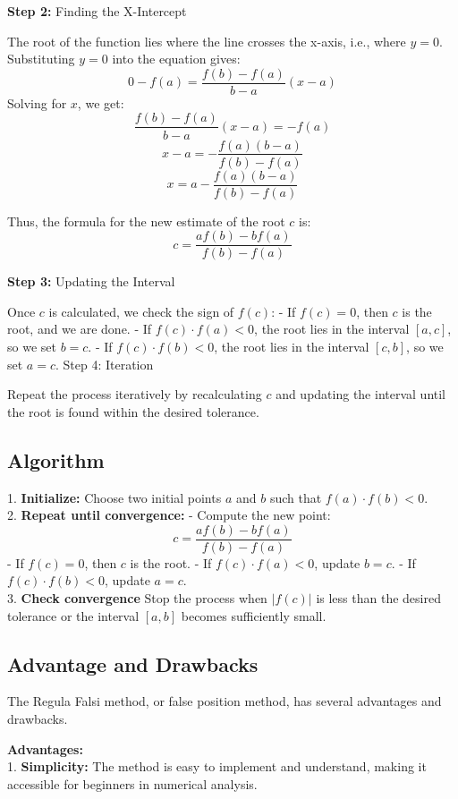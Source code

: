 \documentclass[12pt,a4paper]{article}
\begin{document}
	\textbf{Step 2:} Finding the X-Intercept
	
	The root of the function lies where the line crosses the x-axis, i.e., where \( y = 0 \). Substituting \( y = 0 \) into the equation gives:
	\[
	0 - f(a) = \frac{f(b) - f(a)}{b - a} (x - a)
	\]
	Solving for \( x \), we get:
	\[
	\frac{f(b) - f(a)}{b - a} (x - a) = -f(a)
	\]
	\[
	x - a = -\frac{f(a)(b - a)}{f(b) - f(a)}
	\]
	\[
	x = a - \frac{f(a)(b - a)}{f(b) - f(a)}
	\]
	
	Thus, the formula for the new estimate of the root \( c \) is:
	\[
	c = \frac{a f(b) - b f(a)}{f(b) - f(a)}
	\]
	
	\textbf{Step 3:} Updating the Interval
	
	Once \( c \) is calculated, we check the sign of \( f(c) \):
	- If \( f(c) = 0 \), then \( c \) is the root, and we are done.
	- If \( f(c) \cdot f(a) < 0 \), the root lies in the interval \([a, c]\), so we set \( b = c \).
	- If \( f(c) \cdot f(b) < 0 \), the root lies in the interval \([c, b]\), so we set \( a = c \).
	Step 4: Iteration
	
	Repeat the process iteratively by recalculating \( c \) and updating the interval until the root is found within the desired tolerance.
	
	
	\subsection{Algorithm}
	1. \textbf{Initialize:} Choose two initial points \( a \) and \( b \) such that \( f(a) \cdot f(b) < 0 \). \\
	
	
	2. \textbf{Repeat until convergence:}
	- Compute the new point:
	\[
	c = \frac{a f(b) - b f(a)}{f(b) - f(a)}
	\]
	- If \( f(c) = 0 \), then \( c \) is the root.
	- If \( f(c) \cdot f(a) < 0 \), update \( b = c \).
	- If \( f(c) \cdot f(b) < 0 \), update \( a = c \).\\
	
	3. \textbf{Check convergence} Stop the process when \( |f(c)| \) is less than the desired tolerance or the interval \([a, b]\) becomes sufficiently small.
	
	
	\subsection{Advantage and Drawbacks}
	The Regula Falsi method, or false position method, has several advantages and drawbacks. 
	
	\textbf{Advantages:} \vspace{0.5cm} \\
	1. \textbf{Simplicity:} The method is easy to implement and understand, making it accessible for beginners in numerical analysis.\\
	
\end{document}
